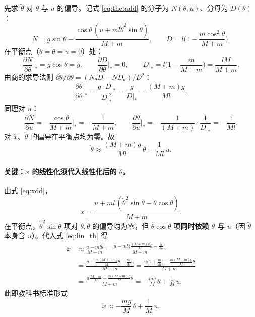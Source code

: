 \documentclass[11pt,a4paper]{article}
\begin{document}
先求 $\ddot\theta$ 对 $\theta$ 与 $u$ 的偏导。记式 \eqref{eq:thetadd} 的分子为 $N(\theta, u)$、分母为 $D(\theta)$：
\begin{equation}
    N = g\sin\theta - \frac{\cos\theta\,(u + ml\dot\theta^2\sin\theta)}{M+m},
    \qquad
    D = l\Big(1 - \frac{m\cos^2\theta}{M+m}\Big) .
\end{equation}
在平衡点（$\theta = \dot\theta = u = 0$）处：
\begin{equation}
    \frac{\partial N}{\partial\theta}\Big|_* = g\cos\theta = g, \qquad
    \frac{\partial D}{\partial\theta}\Big|_* = 0, \qquad
    D|_* = l\Big(1-\frac{m}{M+m}\Big) = \frac{lM}{M+m} .
\end{equation}
由商的求导法则 $\partial\ddot\theta/\partial\theta = (N_\theta D - N D_\theta)/D^2$：
\begin{equation}
    \frac{\partial \ddot\theta}{\partial\theta}\Big|_* = \frac{g \cdot D|_*}{D|_*^2} = \frac{g}{D|_*} = \frac{(M+m)g}{Ml} .
\end{equation}
同理对 $u$：
\begin{equation}
    \frac{\partial N}{\partial u} = -\frac{\cos\theta}{M+m} \Big|_* = -\frac{1}{M+m},
    \qquad
    \frac{\partial \ddot\theta}{\partial u}\Big|_* = -\frac{1}{(M+m)}\cdot\frac{1}{D|_*} = -\frac{1}{Ml} .
\end{equation}
对 $\dot x$、$\dot\theta$ 的偏导在平衡点均为零。故
\begin{equation}
    \ddot\theta \approx \frac{(M+m)g}{Ml}\,\theta - \frac{1}{Ml}\,u .
    \label{eq:lin_th}
\end{equation}

\paragraph{关键：\texorpdfstring{$\ddot x$}{ẍ} 的线性化须代入线性化后的 \texorpdfstring{$\ddot\theta$}{θ̈}。} 由式 \eqref{eq:xdd}，
\begin{equation}
    \ddot x = \frac{u + ml\,(\dot\theta^2\sin\theta - \ddot\theta\cos\theta)}{M+m} .
\end{equation}
在平衡点，$\dot\theta^2\sin\theta$ 项对 $\theta, \dot\theta$ 的偏导均为零，但 $\ddot\theta\cos\theta$ 项\textbf{同时依赖 $\theta$ 与 $u$}（因 $\ddot\theta$ 本身含 $u$）。代入式 \eqref{eq:lin_th} 得
\begin{equation}
\begin{aligned}
    \ddot x &\approx \frac{u - ml\ddot\theta}{M+m}
    = \frac{u - ml\Big(\frac{(M+m)g}{Ml}\theta - \frac{u}{Ml}\Big)}{M+m} \\
    &= \frac{u - \frac{m(M+m)g}{M}\theta + \frac{m}{M}u}{M+m}
    = \frac{u\big(1 + \frac{m}{M}\big) - \frac{m(M+m)g}{M}\theta}{M+m} \\
    &= \frac{u\,\frac{M+m}{M} - \frac{m(M+m)g}{M}\theta}{M+m}
    = -\frac{mg}{M}\,\theta + \frac{1}{M}\,u .
\end{aligned}
\end{equation}
此即教科书标准形式
\begin{equation}
    \ddot x \approx -\frac{mg}{M}\,\theta + \frac{1}{M}\,u .
    \label{eq:lin_x}
\end{equation}
\end{document}
